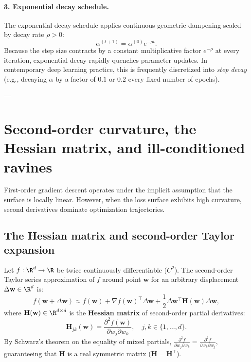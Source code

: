 \paragraph{3. Exponential decay schedule.}
The exponential decay schedule applies continuous geometric dampening scaled by decay rate $\rho > 0$:
\begin{equation}
\alpha^{(t+1)} = \alpha^{(0)} e^{-\rho t}.
\label{eq:exponential_decay_schedule}
\end{equation}
Because the step size contracts by a constant multiplicative factor $e^{-\rho}$ at every iteration, exponential decay rapidly quenches parameter updates. In contemporary deep learning practice, this is frequently discretized into \emph{step decay} (e.g., decaying $\alpha$ by a factor of $0.1$ or $0.2$ every fixed number of epochs).

---

\section{Second-order curvature, the Hessian matrix, and ill-conditioned ravines}
\label{sec:second_order_curvature}

First-order gradient descent operates under the implicit assumption that the surface is locally linear. However, when the loss surface exhibits high curvature, second derivatives dominate optimization trajectories.

\subsection{The Hessian matrix and second-order Taylor expansion}
\label{sec:hessian_matrix}

Let $f: \R^d \to \R$ be twice continuously differentiable ($C^2$). The second-order Taylor series approximation of $f$ around point $\mathbf{w}$ for an arbitrary displacement $\Delta \mathbf{w} \in \R^d$ is:
\begin{equation}
f(\mathbf{w} + \Delta \mathbf{w}) \approx f(\mathbf{w}) + \nabla f(\mathbf{w})^\top \Delta \mathbf{w} + \frac{1}{2} \Delta \mathbf{w}^\top \mathbf{H}(\mathbf{w}) \Delta \mathbf{w},
\label{eq:second_order_taylor}
\end{equation}
where $\mathbf{H}(\mathbf{w}) \in \R^{d \times d}$ is the \textbf{Hessian matrix} of second-order partial derivatives:
\begin{equation}
\mathbf{H}_{jk}(\mathbf{w}) = \frac{\partial^2 f(\mathbf{w})}{\partial w_j \partial w_k}, \quad j, k \in \{1, \dots, d\}.
\label{eq:hessian_def}
\end{equation}
By Schwarz's theorem on the equality of mixed partials, $\frac{\partial^2 f}{\partial w_j \partial w_k} = \frac{\partial^2 f}{\partial w_k \partial w_j}$, guaranteeing that $\mathbf{H}$ is a real symmetric matrix ($\mathbf{H} = \mathbf{H}^\top$).

